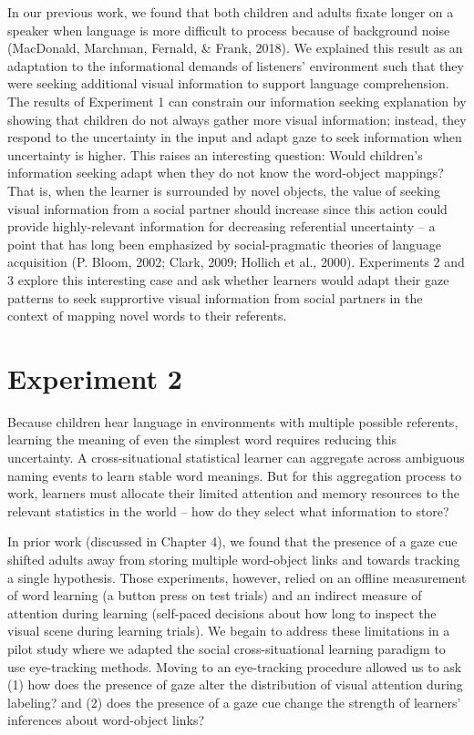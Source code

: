 \documentclass[man,floatsintext]{apa6}
\begin{document}
In our previous work, we found that both children and adults fixate
longer on a speaker when language is more difficult to process because
of background noise (MacDonald, Marchman, Fernald, \& Frank, 2018). We
explained this result as an adaptation to the informational demands of
listeners' environment such that they were seeking additional visual
information to support language comprehension. The results of Experiment
1 can constrain our information seeking explanation by showing that
children do not always gather more visual information; instead, they
respond to the uncertainty in the input and adapt gaze to seek
information when uncertainty is higher. This raises an interesting
question: Would children's information seeking adapt when they do not
know the word-object mappings? That is, when the learner is surrounded
by novel objects, the value of seeking visual information from a social
partner should increase since this action could provide highly-relevant
information for decreasing referential uncertainty -- a point that has
long been emphasized by social-pragmatic theories of language
acquisition (P. Bloom, 2002; Clark, 2009; Hollich et al., 2000).
Experiments 2 and 3 explore this interesting case and ask whether
learners would adapt their gaze patterns to seek supprortive visual
information from social partners in the context of mapping novel words
to their referents.

\section{Experiment 2}\label{experiment-2}

Because children hear language in environments with multiple possible
referents, learning the meaning of even the simplest word requires
reducing this uncertainty. A cross-situational statistical learner can
aggregate across ambiguous naming events to learn stable word meanings.
But for this aggregation process to work, learners must allocate their
limited attention and memory resources to the relevant statistics in the
world -- how do they select what information to store?

In prior work (discussed in Chapter 4), we found that the presence of a
gaze cue shifted adults away from storing multiple word-object links and
towards tracking a single hypothesis. Those experiments, however, relied
on an offline measurement of word learning (a button press on test
trials) and an indirect measure of attention during learning (self-paced
decisions about how long to inspect the visual scene during learning
trials). We begain to address these limitations in a pilot study where
we adapted the social cross-situational learning paradigm to use
eye-tracking methods. Moving to an eye-tracking procedure allowed us to
ask (1) how does the presence of gaze alter the distribution of visual
attention during labeling? and (2) does the presence of a gaze cue
change the strength of learners' inferences about word-object links?
\end{document}
